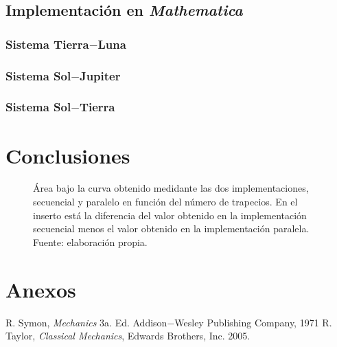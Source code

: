 \subsection{Implementación en \textit{Mathematica}}




\subsubsection{Sistema Tierra$-$Luna}





\subsubsection{Sistema Sol$-$Jupiter}




\subsubsection{Sistema Sol$-$Tierra}





\section{Conclusiones}
\label{sec:conclusiones}

\lipsum[1]

\begin{figure}[H]
  \centering
  \caption{Área bajo la curva obtenido medidante las dos implementaciones,
    secuencial y paralelo en función del número de trapecios.  En el inserto
    está la diferencia del valor obtenido en la implementación secuencial
    menos el valor obtenido en la implementación paralela.  Fuente:
    elaboración propia.}
  \label{fig:Merror}
\end{figure}


\lipsum[1]

\section{Anexos}
\label{sec:anexos}

%

\nocite{*}
%
%

\begin{thebibliography}{00}
 R. Symon, \textit{Mechanics} 3a. Ed. Addison$-$Wesley Publishing Company, 1971
 R. Taylor, \textit{Classical Mechanics}, Edwards Brothers, Inc. 2005.
\end{thebibliography}






